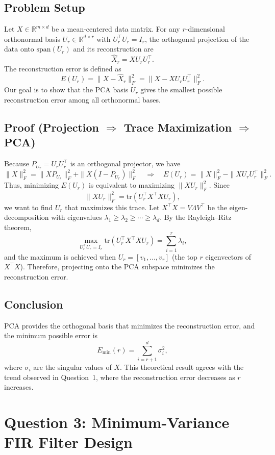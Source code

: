 \documentclass[12pt,a4paper]{article}
\begin{document}
\subsection{Problem Setup}
Let $X \in \mathbb{R}^{m\times d}$ be a mean-centered data matrix.
For any $r$-dimensional orthonormal basis $U_r \in \mathbb{R}^{d\times r}$ with $U_r^\top U_r = I_r$, 
the orthogonal projection of the data onto $\text{span}(U_r)$ and its reconstruction are
\[
\hat X_r = XU_rU_r^\top.
\]
The reconstruction error is defined as
\[
E(U_r) = \|X - \hat X_r\|_F^2 = \|X - XU_rU_r^\top\|_F^2.
\]
Our goal is to show that the PCA basis $U_r$ gives the smallest possible reconstruction error among all orthonormal bases.

\subsection{Proof (Projection $\Rightarrow$ Trace Maximization $\Rightarrow$ PCA)}
Because $P_{U_r}=U_rU_r^\top$ is an orthogonal projector, we have
\[
\|X\|_F^2 = \|XP_{U_r}\|_F^2 + \|X(I-P_{U_r})\|_F^2
\quad\Rightarrow\quad
E(U_r) = \|X\|_F^2 - \|XU_rU_r^\top\|_F^2.
\]
Thus, minimizing $E(U_r)$ is equivalent to maximizing $\|XU_r\|_F^2$.
Since
\[
\|XU_r\|_F^2 = \text{tr}(U_r^\top X^\top XU_r),
\]
we want to find $U_r$ that maximizes this trace.
Let $X^\top X = V\Lambda V^\top$ be the eigen-decomposition with eigenvalues
$\lambda_1 \ge \lambda_2 \ge \cdots \ge \lambda_d$.
By the Rayleigh–Ritz theorem,
\[
\max_{U_r^\top U_r = I_r} \text{tr}(U_r^\top X^\top XU_r)
= \sum_{i=1}^{r}\lambda_i,
\]
and the maximum is achieved when $U_r = [v_1,\ldots,v_r]$ (the top $r$ eigenvectors of $X^\top X$).
Therefore, projecting onto the PCA subspace minimizes the reconstruction error.

\subsection{Conclusion}
PCA provides the orthogonal basis that minimizes the reconstruction error,
and the minimum possible error is
\[
E_{\min}(r) = \sum_{i=r+1}^{d} \sigma_i^2,
\]
where $\sigma_i$ are the singular values of $X$.
This theoretical result agrees with the trend observed in Question~1,
where the reconstruction error decreases as $r$ increases.

\newpage
\newpage
\newpage
\section{Question 3: Minimum-Variance FIR Filter Design}
\end{document}
